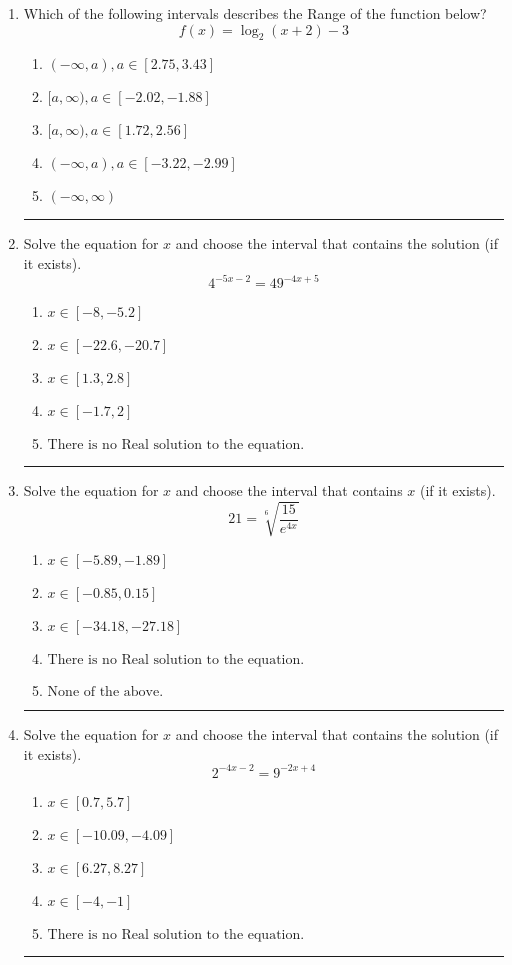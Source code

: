 \documentclass[14pt]{extbook}
\newcommand{\litem}[1]{\item#1\hspace*{-1cm}\rule{\textwidth}{0.4pt}}
\begin{document}
\begin{enumerate}
\litem{
Which of the following intervals describes the Range of the function below?\[ f(x) = \log_2{(x+2)}-3 \]\begin{enumerate}[label=\Alph*.]
\item \( (-\infty, a), a \in [2.75, 3.43] \)
\item \( [a, \infty), a \in [-2.02, -1.88] \)
\item \( [a, \infty), a \in [1.72, 2.56] \)
\item \( (-\infty, a), a \in [-3.22, -2.99] \)
\item \( (-\infty, \infty) \)

\end{enumerate} }
\litem{
Solve the equation for $x$ and choose the interval that contains the solution (if it exists).\[ 4^{-5x-2} = 49^{-4x+5} \]\begin{enumerate}[label=\Alph*.]
\item \( x \in [-8, -5.2] \)
\item \( x \in [-22.6, -20.7] \)
\item \( x \in [1.3, 2.8] \)
\item \( x \in [-1.7, 2] \)
\item \( \text{There is no Real solution to the equation.} \)

\end{enumerate} }
\litem{
 Solve the equation for $x$ and choose the interval that contains $x$ (if it exists).\[  21 = \sqrt[6]{\frac{15}{e^{4x}}} \]\begin{enumerate}[label=\Alph*.]
\item \( x \in [-5.89, -1.89] \)
\item \( x \in [-0.85, 0.15] \)
\item \( x \in [-34.18, -27.18] \)
\item \( \text{There is no Real solution to the equation.} \)
\item \( \text{None of the above.} \)

\end{enumerate} }
\litem{
Solve the equation for $x$ and choose the interval that contains the solution (if it exists).\[ 2^{-4x-2} = 9^{-2x+4} \]\begin{enumerate}[label=\Alph*.]
\item \( x \in [0.7, 5.7] \)
\item \( x \in [-10.09, -4.09] \)
\item \( x \in [6.27, 8.27] \)
\item \( x \in [-4, -1] \)
\item \( \text{There is no Real solution to the equation.} \)


\end{enumerate}}
\end{enumerate}
\end{document}
